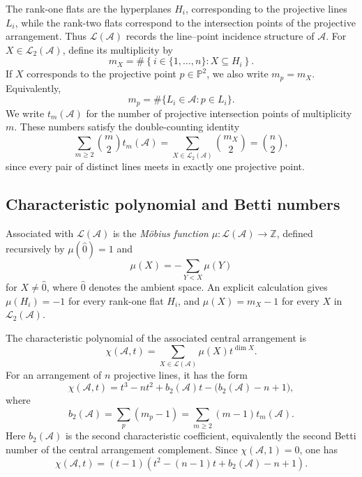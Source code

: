 \documentclass[pdflatex,sn-mathphys-num]{sn-jnl}%
\theoremstyle{remark}
\theoremstyle{definition}
\begin{document}
The rank-one flats are the hyperplanes $H_i$, corresponding to the projective lines $L_i$, while the rank-two flats correspond to the intersection points of the projective arrangement. Thus $\mathcal L(\mathcal{A})$ records the line--point incidence structure of $\mathcal{A}$. For $X\in\mathcal{L}_2(\mathcal{A})$, define its multiplicity by
\[
m_X
=
\#\left\{
i\in\{1,\ldots,n\}:X\subseteq H_i
\right\}.
\]
If $X$ corresponds to the projective point $p\in\mathbb P^2$, we also write $m_p=m_X$. Equivalently,
\[
m_p
=
\#\{L_i\in\mathcal{A}:p\in L_i\}.
\]
We write $t_m(\mathcal{A})$ for the number of projective intersection points of multiplicity $m$. These numbers satisfy the double-counting identity
\begin{equation}
\label{eq:double-counting}
\sum_{m\geq2}\binom{m}{2}t_m(\mathcal{A})
=
\sum_{X\in\mathcal{L}_2(\mathcal{A})}
\binom{m_X}{2}
=
\binom{n}{2},
\end{equation}
since every pair of distinct lines meets in exactly one projective point.

\subsection{Characteristic polynomial and Betti numbers}

Associated with $\mathcal L(\mathcal{A})$ is the \emph{M\"obius function}
$\mu: \mathcal{L}(\mathcal{A})\rightarrow \mathbb{Z}$, defined recursively by $\mu(\hat0)=1$ and
\[
\mu(X)=-\sum_{Y<X}\mu(Y)
\]
for $X\neq\hat0$, where $\hat0$ denotes the ambient space. An explicit calculation gives $\mu(H_i)=-1$ for every rank-one flat $H_i$, and $\mu(X)=m_X-1$ for every $X$ in $\mathcal{L}_2(\mathcal{A})$.

The characteristic polynomial of the associated central arrangement is
\[
\chi(\mathcal{A},t)=\sum_{X\in\mathcal L(\mathcal{A})}
\mu(X)t^{\dim X}.
\]
For an arrangement of $n$ projective lines, it has the form
\begin{equation}
\label{eq:chi}
\chi(\mathcal{A},t)
=t^3-nt^2+b_2(\mathcal{A})t-\bigl(b_2(\mathcal{A})-n+1\bigr),
\end{equation}
where
\begin{equation}
\label{eq:b2}
b_2(\mathcal{A})
=\sum_p(m_p-1)
=\sum_{m\geq2}(m-1)t_m(\mathcal{A}).
\end{equation}
Here $b_2(\mathcal{A})$ is the second characteristic coefficient,
equivalently the second Betti number of the central arrangement complement.
Since $\chi(\mathcal{A},1)=0$, one has
\begin{equation}
\label{eq:chi-factored}
\chi(\mathcal{A},t)
=(t-1)\left(t^2-(n-1)t+b_2(\mathcal{A})-n+1\right).
\end{equation}
\end{document}
